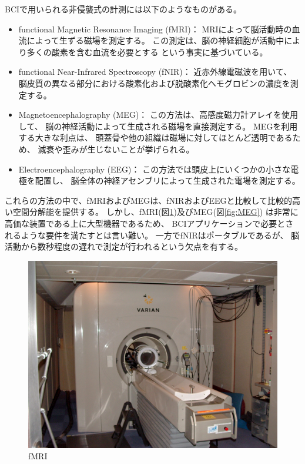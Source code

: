 BCIで用いられる非侵襲式の計測には以下のようなものがある\cite{脳を測る}。
\begin{itemize}
    \item functional Magnetic Resonance Imaging (fMRI)：
    MRIによって脳活動時の血流によって生ずる磁場を測定する。
    この測定は、脳の神経細胞が活動中により多くの酸素を含む血流を必要とする
    という事実に基づいている。
    \item functional Near-Infrared Spectroscopy (fNIR)：
    近赤外線電磁波を用いて、
    脳皮質の異なる部分における酸素化および脱酸素化ヘモグロビンの濃度を測定する。
    \item Magnetoencephalography (MEG)：
    この方法は、高感度磁力計アレイを使用して、
    脳の神経活動によって生成される磁場を直接測定する。
    MEGを利用する大きな利点は、
    頭蓋骨や他の組織は磁場に対してほとんど透明であるため、
    減衰や歪みが生じないことが挙げられる。
    \item Electroencephalography (EEG)：
    この方法では頭皮上にいくつかの小さな電極を配置し、
    脳全体の神経アセンブリによって生成された電場を測定する。
\end{itemize}
これらの方法の中で、fMRIおよびMEGは、fNIRおよびEEGと比較して比較的高い空間分解能を提供する\cite{脳を測る}。
しかし、fMRI(図\ref{fig:fMRI})及びMEG(図\ref{fig:MEG})
は非常に高価な装置である上に大型機器であるため、
BCIアプリケーションで必要とされるような要件を満たすとは言い難い。
一方でfNIRはポータブルであるが、
脳活動から数秒程度の遅れで測定が行われるという欠点を有する\cite{脳を測る}。
\begin{figure}
    \begin{center}
    \includegraphics[width=120mm]{images/fMRI.jpg}
    \end{center}
    \caption{fMRI}
    \label{fig:fMRI}
\end{figure}
